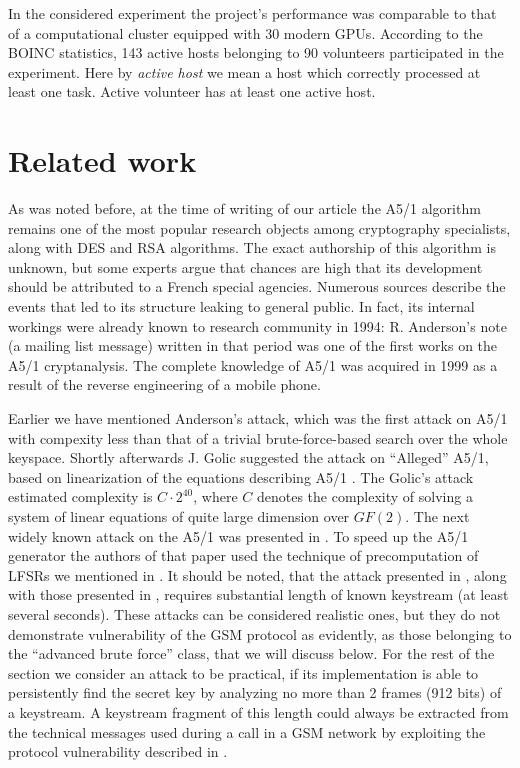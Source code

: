\documentclass[runningheads,a4paper]{llncs}[2015/06/24]
\begin{document}
In the considered experiment the project's performance was comparable to that of a computational cluster equipped with 30 modern GPUs.
According to the BOINC statistics, 143 active hosts belonging to 90 volunteers participated in the experiment. Here by \textit{active host} we mean a host which correctly processed at least one task. Active volunteer has at least one active host.

\section{Related work}
\label{sec:related}

As was noted before, at the time of writing of our article the A5/1 algorithm
remains one of the most popular research objects among cryptography
specialists, along with DES and RSA algorithms. The exact authorship of this
algorithm is unknown, but some experts argue that chances are high that its
development should be attributed to a French special agencies. Numerous sources
describe the events that led to its structure leaking to general public. In
fact, its internal workings were already known to research community in 1994:
R. Anderson's note (a mailing list message) written in that period was one of
the first works on the A5/1 cryptanalysis. The complete knowledge of A5/1 was
acquired in 1999 as a result of the reverse engineering of a mobile phone.

Earlier we have mentioned Anderson's attack, which was the first attack on A5/1 with compexity less
than that of a trivial brute-force-based search over the whole keyspace. Shortly
afterwards J. Golic suggested the attack on ``Alleged'' A5/1, based on
linearization of the equations describing A5/1 \cite{Golic1997}. The Golic's attack
estimated complexity is $C \cdot 2^{40}$, where $C$ denotes the complexity of
solving a system of linear equations of quite large dimension over $GF(2)$. The next widely known attack on the A5/1 was presented in \cite{DBLP:conf/fse/BiryukovSW00}. To speed up the A5/1 generator the authors of that paper used the technique of precomputation of LFSRs we mentioned in . It should be noted, that the attack presented in \cite{DBLP:conf/fse/BiryukovSW00}, along with those presented in
\cite{Biham2000,DBLP:journals/tit/EkdahlJ03,Barkan2008}, requires substantial
length of known keystream (at least several seconds). These attacks can be
considered realistic ones, but they do not demonstrate vulnerability of the GSM
protocol as evidently, as those belonging to the ``advanced brute force'' class,
that we will discuss below. For the rest of the section we consider an attack
to be practical, if its implementation is able to persistently find the
secret key by analyzing no more than 2 frames (912 bits) of a keystream. 
A keystream fragment of this length could always be extracted from the technical messages used during a call in a GSM network by exploiting the protocol vulnerability described in .
\end{document}
